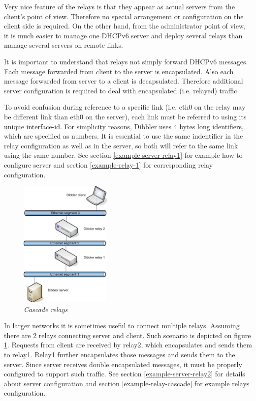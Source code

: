 Very nice feature of the relays is that they appear as actual servers
from the client's point of view. Therefore no special arrangement or
configuration on the client side is required. On the other hand, from
the administrator point of view, it is much easier to manage one DHCPv6
server and deploy several relays than manage several servers on remote
links. 

It is important to understand that relays not simply forward DHCPv6
messages. Each message forwarded from client to the server is
encapsulated. Also each message forwarded from server to a client is
decapsulated. Therefore additional server configuration is required to
deal with encapsulated (i.e. relayed) traffic.

To avoid confusion during reference to a specific link (i.e. eth0 on
the relay may be different link than eth0 on the server), each link
must be referred to using its unique interface-id. For simplicity
reasons, Dibbler uses 4 bytes long identifiers, which are specified as
numbers. It is essential to use the same indentifier in the relay
configuration as well as in the server, so both will refer to the same
link using the same number. See section \ref{example-server-relay1} for
example how to configure server and section \ref{example-relay-1} for 
corresponding relay configuration.

\begin{figure}[ht]
\begin{center}
\includegraphics[width=0.4\textwidth]{dibbler-cascade-relays}
\caption{\emph{Cascade relays}}
\label{fig-cascade-relays}
\end{center}
\end{figure}

In larger networks it is sometimes useful to connect multiple
relays. Assuming there are 2 relays connecting server and client. Such
scenario is depicted on figure \ref{fig-cascade-relays}. Requests from
client are received by relay2, which encapsulates and sends them to
relay1. Relay1 further encapsulates those messages and sends them to
the server. Since server receives double encapsulated messages, it
must be properly configured to support such traffic. See section
\ref{example-server-relay2} for details about server configuration and 
section \ref{example-relay-cascade} for example relays configuration.


